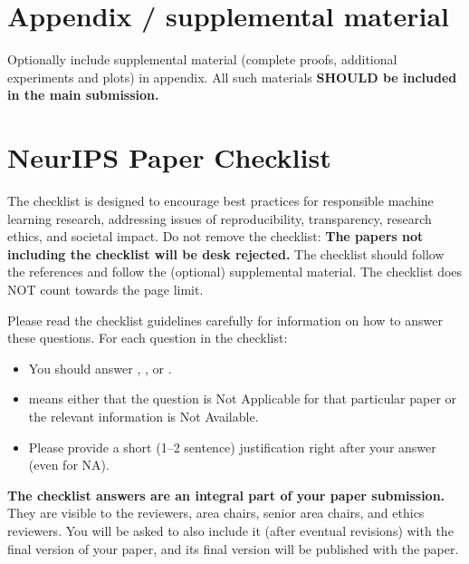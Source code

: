 \documentclass{article}
\begin{document}
\appendix

\section{Appendix / supplemental material}


Optionally include supplemental material (complete proofs, additional experiments and plots) in appendix.
All such materials \textbf{SHOULD be included in the main submission.}


\newpage
\section*{NeurIPS Paper Checklist}

The checklist is designed to encourage best practices for responsible machine learning research, addressing issues of reproducibility, transparency, research ethics, and societal impact. Do not remove the checklist: {\bf The papers not including the checklist will be desk rejected.} The checklist should follow the references and follow the (optional) supplemental material.  The checklist does NOT count towards the page
limit.

Please read the checklist guidelines carefully for information on how to answer these questions. For each question in the checklist:
\begin{itemize}
  \item You should answer \answerYes{}, \answerNo{}, or \answerNA{}.
  \item \answerNA{} means either that the question is Not Applicable for that particular paper or the relevant information is Not Available.
  \item Please provide a short (1–2 sentence) justification right after your answer (even for NA).
\end{itemize}

{\bf The checklist answers are an integral part of your paper submission.} They are visible to the reviewers, area chairs, senior area chairs, and ethics reviewers. You will be asked to also include it (after eventual revisions) with the final version of your paper, and its final version will be published with the paper.
\end{document}
